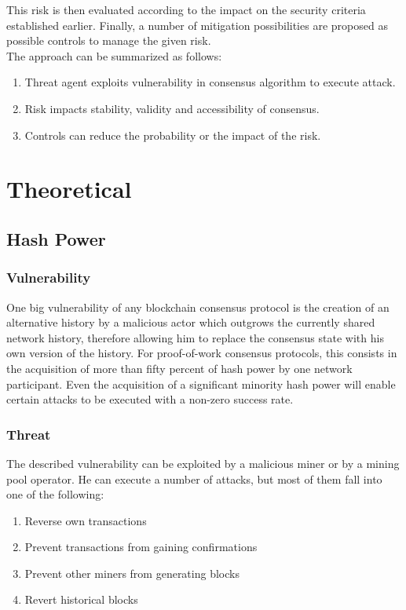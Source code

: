 \documentclass[11pt,a4paper,draft]{article}
\begin{document}
This risk is then evaluated according to the impact on the security criteria established earlier. Finally, a number of mitigation possibilities are proposed as possible controls to manage the given risk.\\

The approach can be summarized as follows:
\begin{enumerate}
  \item Threat agent exploits vulnerability in consensus algorithm to execute attack.
  \item Risk impacts stability, validity and accessibility of consensus.
  \item Controls can reduce the probability or the impact of the risk.
\end{enumerate}

\section{Theoretical}

\subsection{Hash Power}

\subsubsection{Vulnerability}

One big vulnerability of any blockchain consensus protocol is the creation of an alternative history by a malicious actor which outgrows the currently shared network history, therefore allowing him to replace the consensus state with his own version of the history. For proof-of-work consensus protocols, this consists in the acquisition of more than fifty percent of hash power by one network participant. Even the acquisition of a significant minority hash power will enable certain attacks to be executed with a non-zero success rate.\\

\subsubsection{Threat}

The described vulnerability can be exploited by a malicious miner or by a mining pool operator. He can execute a number of attacks, but most of them fall into one of the following:
\begin{enumerate}
  \item Reverse own transactions
  \item Prevent transactions from gaining confirmations
  \item Prevent other miners from generating blocks
  \item Revert historical blocks
\end{enumerate}
\end{document}
